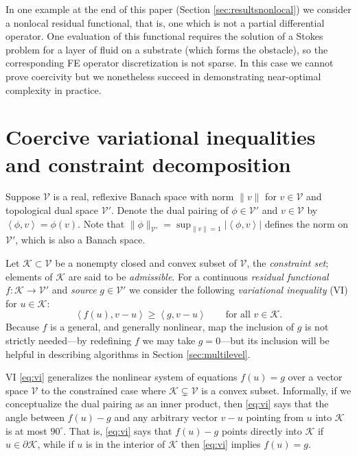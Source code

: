 \documentclass[letterpaper,final,12pt,reqno]{amsart}
\theoremstyle{cstyle}
\theoremstyle{dstyle}
\numberwithin{equation}{section}
\numberwithin{figure}{section}
\numberwithin{table}{section}
\numberwithin{theorem}{section}
\newcommand{\cK}{\mathcal{K}}
\newcommand{\cV}{\mathcal{V}}
\newcommand{\ip}[2]{\left<#1,#2\right>}
\begin{document}
In one example at the end of this paper (Section \ref{sec:resultsnonlocal}) we consider a nonlocal residual functional, that is, one which is not a partial differential operator.  One evaluation of this functional requires the solution of a Stokes problem for a layer of fluid \nocite{SayagWorster2013} on a substrate (which forms the obstacle), so the corresponding FE operator discretization is not sparse.  In this case we cannot prove coercivity but we nonetheless succeed in demonstrating near-optimal complexity in practice.  %


\section{Coercive variational inequalities and constraint decomposition} \label{sec:vi}

Suppose $\cV$ is a real, reflexive Banach space with norm $\|v\|$ for $v\in\cV$ and topological dual space $\cV'$.  Denote the dual pairing of $\phi \in \cV'$ and $v\in\cV$ by $\ip{\phi}{v} = \phi(v)$.  Note that $\|\phi\|_{\cV'} = \sup_{\|v\|=1} |\ip{\phi}{v}|$ defines the norm on $\cV'$, which is also a Banach space.

Let $\cK \subset \cV$ be a nonempty closed and convex subset of $\cV$, the \emph{constraint set}; elements of $\cK$ are said to be \emph{admissible}.  For a continuous \emph{residual functional} $f:\cK \to \cV'$ and \emph{source} $g\in \cV'$ we consider the following \emph{variational inequality} (VI) for $u\in \cK$:
\begin{equation}
\ip{f(u)}{v-u} \ge \ip{g}{v-u} \qquad \text{for all } v\in \cK. \label{eq:vi}
\end{equation}
Because $f$ is a general, and generally nonlinear, map the inclusion of $g$ is not strictly needed---by redefining $f$ we may take $g=0$---but its inclusion will be helpful in describing algorithms in Section \ref{sec:multilevel}.

VI \eqref{eq:vi} generalizes the nonlinear system of equations $f(u)=g$ over a vector space $\cV$ to the constrained case where $\cK \subsetneq \cV$ is a convex subset.  Informally, if we conceptualize the dual pairing as an inner product, then \eqref{eq:vi} says that the angle between $f(u)-g$ and any arbitrary vector $v-u$ pointing from $u$ into $\cK$ is at most $90^\circ$.  That is, \eqref{eq:vi} says that $f(u)-g$ points directly into $\cK$ if $u\in\partial\cK$, while if $u$ is in the interior of $\cK$ then \eqref{eq:vi} implies $f(u)=g$.
\end{document}
